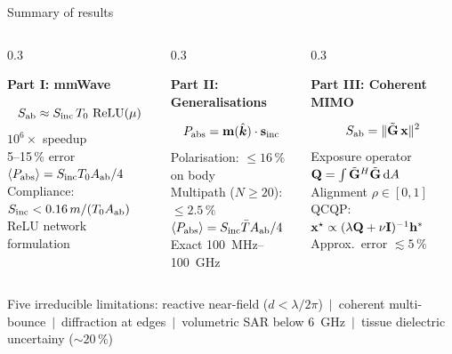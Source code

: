 \begin{frame}{Summary of results}

  \begin{columns}[T]
    \begin{column}{0.3\textwidth}
      \begin{center}
        {\small\bfseries\color{navyblue} Part I: mmWave}
      \end{center}
      {\footnotesize
      \[
        S_{\mathrm{ab}} \approx S_{\mathrm{inc}}\, T_0\, \operatorname{ReLU}(\mu)
      \]
      $10^6\times$ speedup\\
      5--15\,\% error\\
      $\langle P_{\mathrm{abs}}\rangle = S_{\mathrm{inc}} T_0 A_{\mathrm{ab}}/4$\\[2pt]
      Compliance: $S_{\mathrm{inc}} < 0.16\,m/(T_0 A_{\mathrm{ab}})$\\[2pt]
      ReLU network formulation
      }
    \end{column}

    \begin{column}{0.3\textwidth}
      \begin{center}
        {\small\bfseries\color{navyblue} Part II: Generalisations}
      \end{center}
      {\footnotesize
      \[
        P_{\mathrm{abs}} = \mathbf{m}(\hat{\bm{k}}) \cdot \mathbf{s}_{\mathrm{inc}}
      \]
      Polarisation: $\le 16\,\%$ on body\\
      Multipath ($N\ge20$): $\le 2.5\,\%$\\[2pt]
      $\langle P_{\mathrm{abs}}\rangle = S_{\mathrm{inc}} \bar{T} A_{\mathrm{ab}}/4$\\[2pt]
      Exact \SI{100}{\mega\hertz}--\SI{100}{\giga\hertz}
      }
    \end{column}

    \begin{column}{0.3\textwidth}
      \begin{center}
        {\small\bfseries\color{navyblue} Part III: Coherent MIMO}
      \end{center}
      {\footnotesize
      \[
        S_{\mathrm{ab}} = \|\tilde{\mathbf{G}}\,\mathbf{x}\|^2
      \]
      Exposure operator $\mathbf{Q} = \int \tilde{\mathbf{G}}^H \tilde{\mathbf{G}}\,\mathrm{d} A$\\[2pt]
      Alignment $\rho \in [0,1]$\\[2pt]
      QCQP: $\mathbf{x}^\star \propto (\lambda\mathbf{Q}+\nu\mathbf{I})^{-1}\mathbf{h}^*$\\[2pt]
      Approx.\ error $\lesssim 5\,\%$
      }
    \end{column}
  \end{columns}

  \vspace{8pt}
  Five irreducible limitations:
  {\footnotesize
  reactive near-field ($d < \lambda/2\pi$) \,$\mid$\,
  coherent multi-bounce \,$\mid$\,
  diffraction at edges \,$\mid$\,
  volumetric SAR below \SI{6}{\giga\hertz} \,$\mid$\,
  tissue dielectric uncertainy (${\sim}20\,\%$)
  }
\end{frame}

